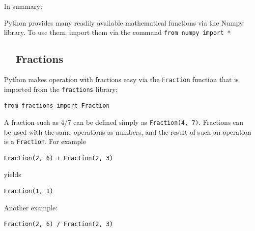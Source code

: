 \documentclass[article,A4,12pt]{llncs}
\begin{document}
\noindent
In summary:\\

\begin{gbox}
\begin{center}
Python provides many readily available mathematical functions via the Numpy library.
To use them, import them via the command {\tt from numpy import *}
\end{center}
\end{gbox}


\subsection{\ \ Fractions}

Python makes operation with fractions easy via the {\tt Fraction}
function that is imported from the {\tt fractions} library:\\

\begin{bbox}
\begin{verbatim}
from fractions import Fraction
\end{verbatim}
\end{bbox}
\vspace{6mm}

\noindent
A fraction such as 4/7 can be defined simply as {\tt Fraction(4, 7)}. 
Fractions can be used with the same operations as numbers, and the result 
of such an operation is a {\tt Fraction}. For example\\

\begin{bbox}
\begin{verbatim}
Fraction(2, 6) + Fraction(2, 3)
\end{verbatim}
\end{bbox}
\vspace{6mm}

\noindent
yields\\

\begin{ybox}
\begin{verbatim}
Fraction(1, 1)
\end{verbatim}
\end{ybox}
\vspace{6mm}

\noindent
Another example: \\

\begin{bbox}
\begin{verbatim}
Fraction(2, 6) / Fraction(2, 3)
\end{verbatim}
\end{bbox}
\vspace{6mm}
\end{document}
